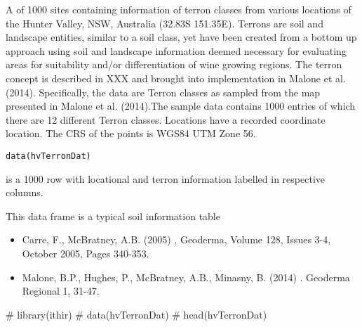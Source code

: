 \documentclass[a4paper]{book}
\begin{document}
%
\begin{Description}
A  of 1000 sites containing information of terron classes from various locations of the Hunter Valley, NSW, Australia (32.83S 151.35E). Terrons are soil and landscape entities, similar to a soil class, yet have been created from a bottom up approach using soil and landscape information deemed necessary for evaluating areas for suitability and/or  differentiation of wine growing regions. The terron concept is described in XXX and brought into implementation in Malone et al. (2014). Specifically, the data are Terron classes as sampled from the map presented in Malone et al. (2014).The sample data contains 1000 entries of which there are 12 different Terron classes. Locations have a recorded coordinate location. The CRS of the points is WGS84 UTM Zone 56.
\end{Description}
%
\begin{Usage}
\begin{verbatim}
data(hvTerronDat)
\end{verbatim}
\end{Usage}
%
\begin{Format}
 is a 1000 row  with locational and terron information labelled in respective columns. 
\end{Format}
%
\begin{Details}
This data frame is a typical soil information table
\end{Details}
%
\begin{References}
\begin{itemize}

\item{} Carre, F., McBratney, A.B. (2005) , Geoderma, Volume 128, Issues 3-4, October 2005, Pages 340-353.

\item{} Malone, B.P., Hughes, P.,  McBratney, A.B., Minasny, B. (2014) . Geoderma Regional 1, 31-47.



\end{itemize}

\end{References}
%
\begin{Examples}
\begin{ExampleCode}

# library(ithir)
# data(hvTerronDat)
# head(hvTerronDat)

\end{ExampleCode}
\end{Examples}
\end{document}
